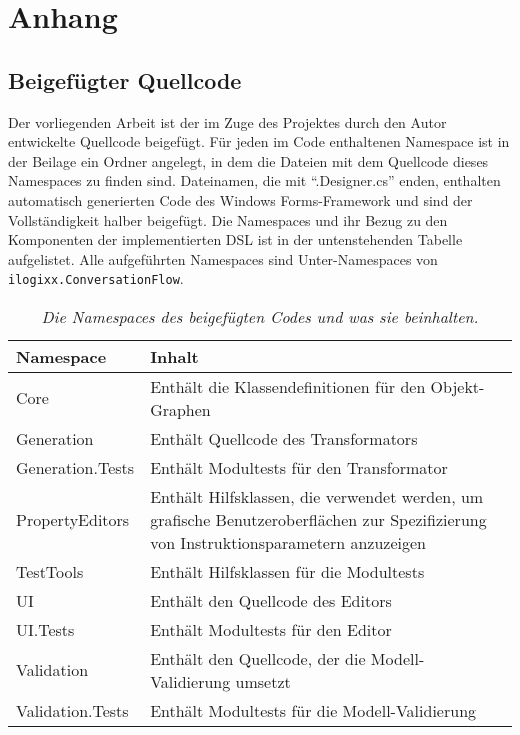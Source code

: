 \chapter{Anhang}

\section{Beigefügter Quellcode}
Der vorliegenden Arbeit ist der im Zuge des Projektes durch den Autor entwickelte Quellcode beigefügt. Für jeden im Code enthaltenen Namespace ist in der Beilage ein Ordner angelegt, in dem die Dateien mit dem Quellcode dieses Namespaces zu finden sind. Dateinamen, die mit ``.Designer.cs''  enden, enthalten automatisch generierten Code des Windows Forms-Framework und sind der Vollständigkeit halber beigefügt. Die Namespaces und ihr Bezug zu den Komponenten der implementierten DSL ist in der untenstehenden Tabelle aufgelistet. Alle aufgeführten Namespaces sind Unter-Namespaces von \texttt{ilogixx.ConversationFlow}.

\begin{table}[hbtp]
\centering
\settowidth{}
\begin{tabulary}{1.0\textwidth}{L|L}
\textbf{Namespace} & \textbf{Inhalt} \\
\hline

Core & Enthält die Klassendefinitionen für den Objekt-Graphen \\
\hline

Generation & Enthält Quellcode des Transformators \\
\hline

Generation.Tests & Enthält Modultests für den Transformator\\
\hline

PropertyEditors & Enthält Hilfsklassen, die verwendet werden, um grafische Benutzeroberflächen zur Spezifizierung von Instruktionsparametern anzuzeigen \\
\hline

TestTools & Enthält Hilfsklassen für die Modultests\\
\hline

UI & Enthält den Quellcode des Editors \\
\hline

UI.Tests & Enthält Modultests für den Editor \\
\hline

Validation & Enthält den Quellcode, der die Modell-Validierung umsetzt \\
\hline

Validation.Tests & Enthält Modultests für die Modell-Validierung \\

\end{tabulary}
\caption{\textit{Die Namespaces des beigefügten Codes und was sie beinhalten.}}
\label{tab:namespaces}
\end{table}





